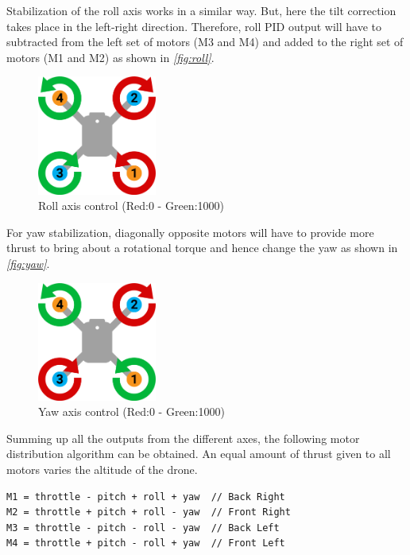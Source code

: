\documentclass[a4paper,12pt,oneside]{book}
\begin{document}
Stabilization of the roll axis works in a similar way. But, here the tilt correction takes place in the left-right direction. Therefore, roll PID output will have to subtracted from the left set of motors (M3 and M4) and added to the right set of motors (M1 and M2) as shown in \textit{\autoref{fig:roll}}.\\

\begin{figure}[!htb]
\centering
\includegraphics[width=0.35\textwidth]{images/roll}
\caption{Roll axis control (Red:0 - Green:1000)}
\label{fig:roll}
\end{figure}

For yaw stabilization, diagonally opposite motors will have to provide more thrust to bring about a rotational torque and hence change the yaw as shown in \textit{\autoref{fig:yaw}}.\\

\begin{figure}[!htb]
\centering
\includegraphics[width=0.35\textwidth]{images/yaw}
\caption{Yaw axis control (Red:0 - Green:1000)}
\label{fig:yaw}
\end{figure}

Summing up all the outputs from the different axes, the following motor distribution algorithm can be obtained. An equal amount of thrust given to all motors varies the altitude of the drone.\\

\begin{center}
\begin{BVerbatim}
M1 = throttle - pitch + roll + yaw  // Back Right
M2 = throttle + pitch + roll - yaw  // Front Right
M3 = throttle - pitch - roll - yaw  // Back Left
M4 = throttle + pitch - roll + yaw  // Front Left	
\end{BVerbatim}
\end{center}
\end{document}
